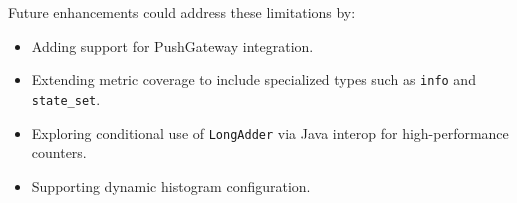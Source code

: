 Future enhancements could address these limitations by:
\begin{itemize}
  \item Adding support for PushGateway integration.
  \item Extending metric coverage to include specialized types such as \texttt{info} and \texttt{state\_set}.
  \item Exploring conditional use of \texttt{LongAdder} via Java interop for high-performance counters.  \item Supporting dynamic histogram configuration.
\end{itemize}


